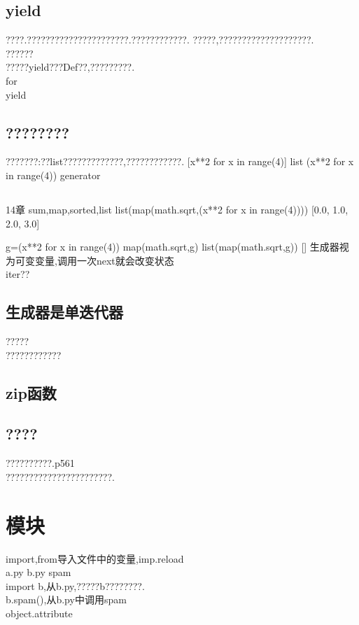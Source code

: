 \section{yield}
????.??????????????????????.????????????.
?????,????????????????????.\\
??????\\
?????yield???Def??,?????????.\\
for \\
yield\\
\section{????????}
???????:??list?????????????,????????????.
[x**2 for x in range(4)]
list
(x**2 for x in range(4))
generator
\section{}
14章
sum,map,sorted,list
list(map(math.sqrt,(x**2 for x in range(4))))
[0.0, 1.0, 2.0, 3.0]

g=(x**2 for x in range(4))
map(math.sqrt,g)
list(map(math.sqrt,g))
[]
生成器视为可变变量,调用一次next就会改变状态\\
iter??
\section{生成器是单迭代器}
?????\\
????????????\\
\section{zip函数}
\section{????}
??????????.p561\\
???????????????????????.\\
\chapter{模块}
import,from导入文件中的变量,imp.reload\\
a.py b.py spam\\
import b,从b.py,?????b????????.\\
b.spam(),从b.py中调用spam\\
object.attribute
